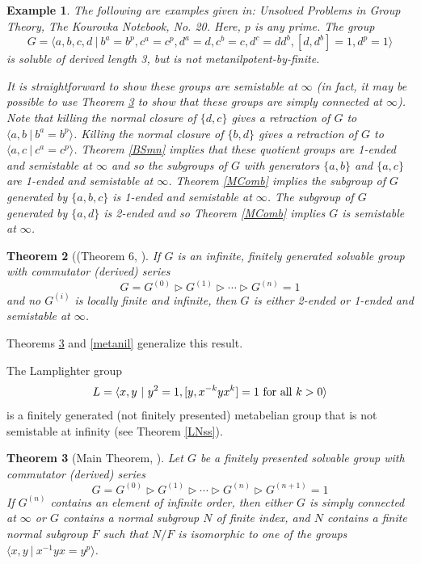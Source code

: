 \documentclass[12pt]{article}
\newtheorem{theorem}{Theorem}[subsection]
\newtheorem{example}[theorem]{Example}
\begin{document}
\begin{example} The following are examples given in: {\it Unsolved Problems in Group Theory, The Kourovka Notebook, No. 20.}  Here, $p$ is any prime. The group 
$$G = \langle a, b, c, d \ |\  b^a = b^p, c^a = c^p, d^a = d, c^b = c, d^c = dd^b, [d, d^b] = 1, d^p = 1\rangle$$ 
is soluble of derived length 3, but is not metanilpotent-by-finite. 

It is straightforward to show these groups are semistable at $\infty$ (in fact, it may be possible to use Theorem \ref{MT87} to show that these groups are simply connected at $\infty$). Note that killing the normal closure of $\{d,c\}$ gives a retraction of $G$ to $\langle a,b \ |\  b^a=b^p\rangle$. Killing the normal closure of $\{b,d\}$ gives a retraction of $G$ to $\langle a,c \ | \  c^a=c^p\rangle$. Theorem \ref{BSmn} implies that these quotient groups are 1-ended and semistable at $\infty$ and so the subgroups of $G$ with generators $\{a,b\}$ and $\{a,c\}$ are 1-ended and semistable at $\infty$. Theorem \ref{MComb} implies the subgroup of $G$ generated by $\{a,b,c\}$ is 1-ended and semistable at $\infty$. The subgroup of $G$ generated by $\{a,d\}$ is 2-ended and so Theorem \ref{MComb} implies $G$ is semistable at $\infty$. 
\end{example}

\begin{theorem} [(Theorem 6, \cite{M4}] \label{solv1} 
If $G$ is an infinite, finitely generated solvable group with commutator (derived) series 
$$G=G^{(0)}\triangleright G^{(1)}\triangleright \cdots\triangleright G^{(n)}=1$$
and no $G^{(i)}$ is locally finite and infinite, then $G$ is either 2-ended or 1-ended and semistable at $\infty$. 
\end{theorem}
Theorems \ref{MT87} and \ref{metanil} generalize this result.

The Lamplighter group 
$$L=\langle x, y  \ |\  y^2=1, [y,x^{-k}yx^k]=1 \hbox{ for all } k>0\rangle$$
is a finitely generated (not finitely presented) metabelian group that is not semistable at infinity (see Theorem \ref{LNss}).
\begin{theorem} [Main Theorem, \cite{M87a}] \label{MT87} 
Let $G$ be a finitely presented solvable group with commutator (derived) series 
$$G=G^{(0)}\triangleright G^{(1)}\triangleright \cdots\triangleright G^{(n)}\triangleright G^{(n+1)}=1$$
If $G^{(n)}$ contains an element of infinite order, then either $G$ is simply connected at $\infty$ or $G$ contains a normal subgroup $N$ of finite index, and $N$ contains a finite normal subgroup $F$ such that $N/F$ is isomorphic to one of the groups $\langle x,y\ |\ x^{-1}yx=y^p\rangle$. 
\end{theorem} 
\end{document}
